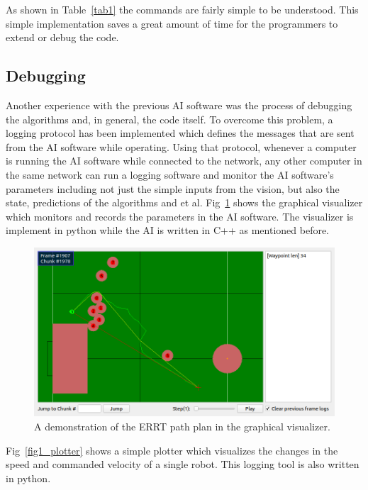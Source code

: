 \documentclass[runningheads]{llncs}
\begin{document}
As shown in Table~\ref{tab1} the commands are fairly simple to be understood. This simple implementation saves a great amount of time for the programmers to extend or debug the code.

\subsection{Debugging}
Another experience with the previous AI software was the process of debugging the algorithms and, in general, the code itself. To overcome this problem, a logging protocol has been implemented which defines the messages that are sent from the AI software while operating. Using that protocol, whenever a computer is running the AI software while connected to the network, any other computer in the same network can run a logging software and monitor the AI software's parameters including not just the simple inputs from the vision, but also the state, predictions of the algorithms and et al. Fig~\ref{fig_visualizer} shows the graphical visualizer which monitors and records the parameters in the AI software. The visualizer is implement in python while the AI is written in C++ as mentioned before.

\begin{figure}
\includegraphics[width=\textwidth]{images/visual1.png}
\caption{A demonstration of the ERRT path plan in the graphical visualizer.} \label{fig_visualizer}
\end{figure}

Fig~\ref{fig1_plotter} shows a simple plotter which  visualizes the changes in the speed and commanded velocity of a single robot. This logging tool is also written in python.
\end{document}
